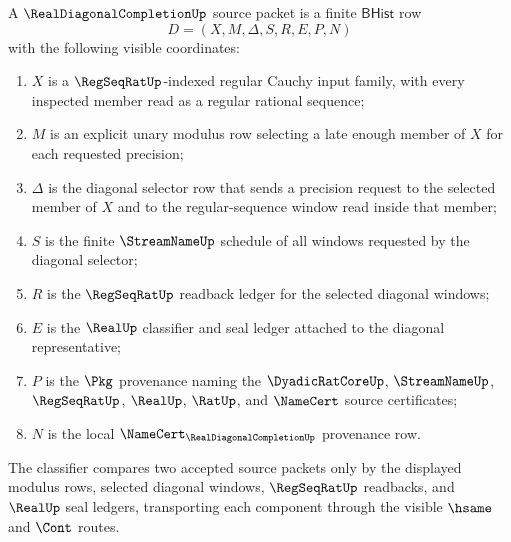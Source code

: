 \begin{definition}
\label{def:real-diagonal-completion-source}
A $\RealDiagonalCompletionUp$ source packet is a finite $\mathsf{BHist}$ row
$$
D=(X,M,\Delta,S,R,E,P,N)
$$
with the following visible coordinates:
\begin{enumerate}
\item $X$ is a $\RegSeqRatUp$-indexed regular Cauchy input family, with every inspected member read as a regular rational sequence;
\item $M$ is an explicit unary modulus row selecting a late enough member of $X$ for each requested precision;
\item $\Delta$ is the diagonal selector row that sends a precision request to the selected member of $X$ and to the regular-sequence window read inside that member;
\item $S$ is the finite $\StreamNameUp$ schedule of all windows requested by the diagonal selector;
\item $R$ is the $\RegSeqRatUp$ readback ledger for the selected diagonal windows;
\item $E$ is the $\RealUp$ classifier and seal ledger attached to the diagonal representative;
\item $P$ is the $\Pkg$ provenance naming the $\DyadicRatCoreUp$, $\StreamNameUp$, $\RegSeqRatUp$, $\RealUp$, $\RatUp$, and $\NameCert$ source certificates;
\item $N$ is the local $\NameCert_{\RealDiagonalCompletionUp}$ provenance row.
\end{enumerate}
The classifier compares two accepted source packets only by the displayed modulus rows, selected diagonal windows, $\RegSeqRatUp$ readbacks, and $\RealUp$ seal ledgers, transporting each component through the visible $\hsame$ and $\Cont$ routes.
\end{definition}

